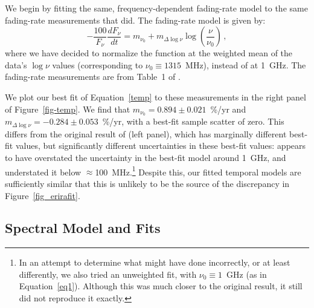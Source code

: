 \documentclass[fleqn,usenatbib]{mnras}
\begin{document}
We begin by fitting the same, frequency-dependent fading-rate model to the same fading-rate measurements that \citet{b77} did.  The fading-rate model is given by:
\begin{equation}\label{temp}
-\frac{100}{F_\nu}\frac{dF_\nu}{dt} = m_{\nu_0}+m_{\Delta\log\nu}\log\left(\frac{\nu}{\nu_0}\right) \, ,
\end{equation}
where we have decided to normalize the function at the weighted mean of the data's $\log\nu$ values (corresponding to $\nu_0 \equiv 1315$~MHz), instead of at 1~GHz.  The fading-rate measurements are from Table~1 of \citet{b77}.

We plot our best fit of Equation~\ref{temp} to these measurements in the right panel of Figure~\ref{fig-temp}.  We find that $m_{\nu_0} = 0.894 \pm 0.021$~\%/yr and $m_{\Delta\log\nu} = -0.284 \pm 0.053$~\%/yr, with a best-fit sample scatter of zero.  This differs from the original result of \citet{b77} (left panel), which has marginally different best-fit values, but significantly different uncertainties in these best-fit values:  \citet{b77} appears to have overstated the uncertainty in the best-fit model around 1~GHz, and understated it below $\approx$100~MHz.\footnote{In an attempt to determine what \citet{b77} might have done incorrectly, or at least differently, we also tried an unweighted fit, with $\nu_0 \equiv 1$~GHz (as in Equation~\ref{eq1}).  Although this was much closer to the original result, it still did not reproduce it exactly.}  Despite this, our fitted temporal models are sufficiently similar that this is unlikely to be the source of the discrepancy in Figure~\ref{fig_erirafit}.

\subsection{Spectral Model and Fits} \label{ball}
\end{document}
